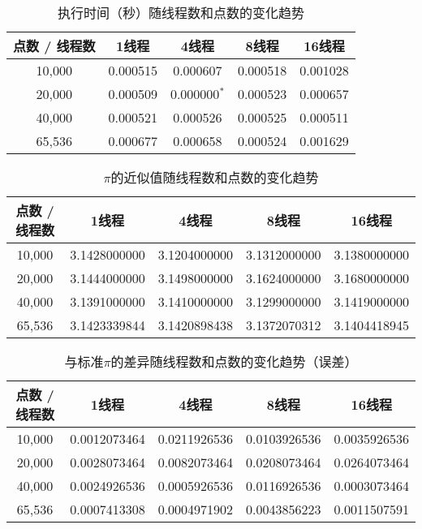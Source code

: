 \documentclass{SYSUReport}
\begin{document}
\begin{table}[H]
\centering
\caption{执行时间（秒）随线程数和点数的变化趋势}
\begin{tabular}{|c|c|c|c|c|}
\hline
点数 / 线程数 & 1线程 & 4线程 & 8线程 & 16线程 \\
\hline
10,000 & 0.000515 & 0.000607 & 0.000518 & 0.001028 \\
\hline
20,000 & 0.000509 & 0.000000$^*$ & 0.000523 & 0.000657 \\
\hline
40,000 & 0.000521 & 0.000526 & 0.000525 & 0.000511 \\
\hline
65,536 & 0.000677 & 0.000658 & 0.000524 & 0.001629 \\
\hline
\end{tabular}
\end{table}

\begin{table}[H]
\centering
\caption{$\pi$的近似值随线程数和点数的变化趋势}
\begin{tabular}{|c|c|c|c|c|}
\hline
点数 / 线程数 & 1线程 & 4线程 & 8线程 & 16线程 \\
\hline
10,000 & 3.1428000000 & 3.1204000000 & 3.1312000000 & 3.1380000000 \\
\hline
20,000 & 3.1444000000 & 3.1498000000 & 3.1624000000 & 3.1680000000 \\
\hline
40,000 & 3.1391000000 & 3.1410000000 & 3.1299000000 & 3.1419000000 \\
\hline
65,536 & 3.1423339844 & 3.1420898438 & 3.1372070312 & 3.1404418945 \\
\hline
\end{tabular}
\end{table}

\begin{table}[H]
\centering
\caption{与标准$\pi$的差异随线程数和点数的变化趋势（误差）}
\begin{tabular}{|c|c|c|c|c|}
\hline
点数 / 线程数 & 1线程 & 4线程 & 8线程 & 16线程 \\
\hline
10,000 & 0.0012073464 & 0.0211926536 & 0.0103926536 & 0.0035926536 \\
\hline
20,000 & 0.0028073464 & 0.0082073464 & 0.0208073464 & 0.0264073464 \\
\hline
40,000 & 0.0024926536 & 0.0005926536 & 0.0116926536 & 0.0003073464 \\
\hline
65,536 & 0.0007413308 & 0.0004971902 & 0.0043856223 & 0.0011507591 \\
\hline
\end{tabular}
\end{table}
\end{document}
